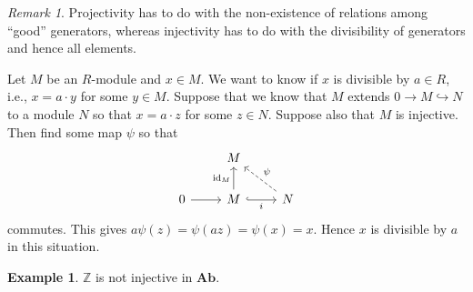 \documentclass[10pt,letterpaper,cm]{nupset}
\theoremstyle{definition}
\newtheorem{exmp}[definition]{Example}
\theoremstyle{theorem}
\theoremstyle{remark}
\newtheorem{remark}[definition]{Remark}
\newcommand{\Z}{\mathbb Z}
\newcommand{\1}{\mathbf{1}}
\newcommand{\0}{\vec 0}
\DeclareMathOperator{\id}{id}
\begin{document}
\begin{remark}
Projectivity has to do with the non-existence of relations among ``good'' generators, whereas injectivity has to do with the divisibility of generators and hence all elements.

Let $M$ be an $R$-module and $x\in M$. We want to know if $x$ is divisible by $a\in R$, i.e., $x = a \cdot y$ for some $y\in M$. Suppose that we know that $M$ extends $0 \to M \hookrightarrow N$ to a module $N$ so that $x = a \cdot z$ for some $z \in N$. Suppose also that $M$ is injective. Then find  some map $\psi$ so that 
\[
\begin{tikzcd}
 & M &  \\
0 \arrow[r] & M \arrow[r, "i"', hook] \arrow[u, "\id_M"] & N \arrow[lu, "\psi"', dashed]
\end{tikzcd}
\] commutes. This gives $a\psi(z) = \psi(az) = \psi(x) = x$. Hence $x$ is divisible by $a$ in this situation.
\end{remark}

\begin{exmp}
$\Z$ is not injective in $\mathbf{Ab}$.
\end{exmp}
\end{document}
